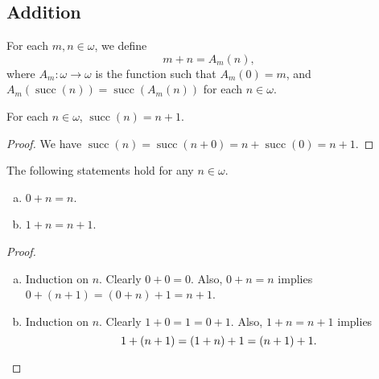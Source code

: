 \documentclass[11pt]{article}
\DeclareMathOperator{\suc}{succ}
\begin{document}
\subsection{Addition}
\begin{definition}
  For each $m, n \in \omega$, we define
  \begin{equation*}
    m + n = A_m(n),
  \end{equation*}
  where $A_m: \omega \to \omega$ is the function such that $A_m(0) = m$, and $A_m(\suc(n)) = \suc(A_m(n))$ for each $n \in \omega$.
\end{definition}

\begin{proposition}
  For each $n \in \omega$, $\suc(n) = n + 1$.
\end{proposition}
\begin{proof}
  We have $\suc(n) = \suc(n + 0) = n + \suc(0) = n + 1$.
\end{proof}

\begin{proposition}
  The following statements hold for any $n \in \omega$.
  \begin{enumerate}[(a)]
    \item $0 + n = n$.
    \item $1 + n = n + 1$.
  \end{enumerate}
\end{proposition}
\begin{proof}
  \leavevmode
  \begin{enumerate}[(a)]
    \item Induction on $n$.
    Clearly $0 + 0 = 0$.
    Also, $0 + n = n$ implies $0 + (n + 1) = (0 + n) + 1 = n + 1$.
    \item Induction on $n$.
    Clearly $1 + 0 = 1 = 0 + 1$.
    Also, $1 + n = n + 1$ implies
    \begin{equation*}
      1 + (n + 1) = (1 + n) + 1 = (n + 1) + 1.
      \qedhere
    \end{equation*}
  \end{enumerate}
\end{proof}
\end{document}
